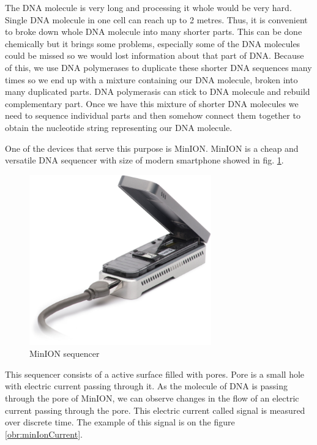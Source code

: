 The DNA molecule is very long and processing it whole would be very hard. Single
DNA molecule in one cell can reach up to 2 metres.
Thus, it is convenient to broke down whole DNA molecule into many shorter parts.
This can be done chemically but it brings some problems, especially some of the
DNA molecules could be missed so we would lost information about that part of DNA.
Because of this, we use DNA polymerases to duplicate these shorter DNA sequences
many times so we end up with a mixture containing our DNA molecule, broken into
many duplicated parts. DNA polymerasis can stick to DNA molecule and rebuild complementary
part. Once we have this mixture of shorter DNA molecules we need to sequence individual
parts and then somehow connect them together to obtain the nucleotide string representing
our DNA molecule.

One of the devices that serve this purpose is MinION\cite{lu2016oxford}. MinION is
a cheap and versatile DNA sequencer with size of modern smartphone showed in fig.
\ref{obr:minIon}.

\begin{figure}
\centerline{\includegraphics[width=0.7\textwidth, height=0.3\textheight]{images/minion}}
\caption[MinION]{MinION sequencer}
\label{obr:minIon}
\end{figure}

This sequencer
consists of a active surface filled with pores. Pore is a small hole with electric current passing through it. 
As the molecule of DNA is passing through the pore of MinION, we can observe
changes in the flow of an electric current passing through the pore. This electric
current called signal is measured over discrete time. The example of this signal
is on the figure \ref{obr:minIonCurrent}.

